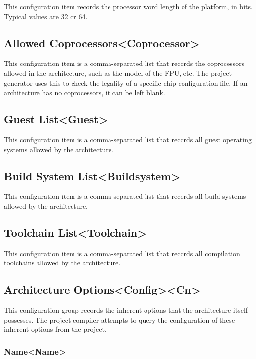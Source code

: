 This configuration item records the processor word length of the platform, in bits. Typical values are 32 or 64.

\subsection{Allowed Coprocessors<Coprocessor>{}}\label{subsec:5-4-4}

This configuration item is a comma-separated list that records the coprocessors allowed in the architecture, such as the model of the FPU, etc. The project generator uses this to check the legality of a specific chip configuration file. If an architecture has no coprocessors, it can be left blank.

\subsection{Guest List<Guest>{}}\label{subsec:5-4-5}

This configuration item is a comma-separated list that records all guest operating systems allowed by the architecture.

\subsection{Build System List<Buildsystem>{}}\label{subsec:5-4-6}

This configuration item is a comma-separated list that records all build systems allowed by the architecture.

\subsection{Toolchain List<Toolchain>{}}\label{subsec:5-4-7}

This configuration item is a comma-separated list that records all compilation toolchains allowed by the architecture.

\subsection{Architecture Options<Config><Cn>{}}\label{subsec:5-4-8}

This configuration group records the inherent options that the architecture itself possesses. The project compiler attempts to query the configuration of these inherent options from the project.

\subsubsection{Name<Name>{}}\label{subsubsec:5-4-8-1}

